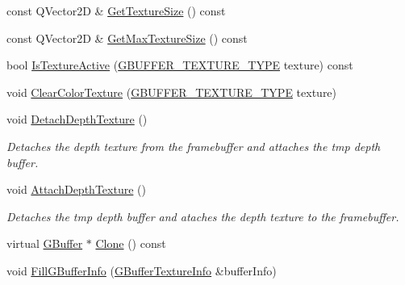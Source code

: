\begin{DoxyCompactItemize}
\item 
const Q\+Vector2D \& \mbox{\hyperlink{class_geometry_engine_1_1_geometry_buffer_1_1_g_buffer_a2b829115597fc587cd6f4ddb52b875cc}{Get\+Texture\+Size}} () const
\item 
const Q\+Vector2D \& \mbox{\hyperlink{class_geometry_engine_1_1_geometry_buffer_1_1_g_buffer_a47bda4849000d2728538de4e2f27f11a}{Get\+Max\+Texture\+Size}} () const
\item 
bool \mbox{\hyperlink{class_geometry_engine_1_1_geometry_buffer_1_1_g_buffer_a66ccde86e455532b2eac771163570f04}{Is\+Texture\+Active}} (\mbox{\hyperlink{class_geometry_engine_1_1_geometry_buffer_1_1_g_buffer_a718dceafcac1915f7de061108597e1cc}{G\+B\+U\+F\+F\+E\+R\+\_\+\+T\+E\+X\+T\+U\+R\+E\+\_\+\+T\+Y\+PE}} texture) const
\item 
void \mbox{\hyperlink{class_geometry_engine_1_1_geometry_buffer_1_1_g_buffer_abf39c85cb87eaf0475205b59333253c0}{Clear\+Color\+Texture}} (\mbox{\hyperlink{class_geometry_engine_1_1_geometry_buffer_1_1_g_buffer_a718dceafcac1915f7de061108597e1cc}{G\+B\+U\+F\+F\+E\+R\+\_\+\+T\+E\+X\+T\+U\+R\+E\+\_\+\+T\+Y\+PE}} texture)
\item 
\mbox{\label{class_geometry_engine_1_1_geometry_buffer_1_1_g_buffer_a95a83a79632226dd0cc8878af9c76f62}} 
void \mbox{\hyperlink{class_geometry_engine_1_1_geometry_buffer_1_1_g_buffer_a95a83a79632226dd0cc8878af9c76f62}{Detach\+Depth\+Texture}} ()
\begin{DoxyCompactList}\small\item\em Detaches the depth texture from the framebuffer and attaches the tmp depth buffer. \end{DoxyCompactList}\item 
\mbox{\label{class_geometry_engine_1_1_geometry_buffer_1_1_g_buffer_a3a95e0e90117676e44a29c09eb15c65d}} 
void \mbox{\hyperlink{class_geometry_engine_1_1_geometry_buffer_1_1_g_buffer_a3a95e0e90117676e44a29c09eb15c65d}{Attach\+Depth\+Texture}} ()
\begin{DoxyCompactList}\small\item\em Detaches the tmp depth buffer and ataches the depth texture to the framebuffer. \end{DoxyCompactList}\item 
virtual \mbox{\hyperlink{class_geometry_engine_1_1_geometry_buffer_1_1_g_buffer}{G\+Buffer}} $\ast$ \mbox{\hyperlink{class_geometry_engine_1_1_geometry_buffer_1_1_g_buffer_af993f8c23f7e78051f3071be4873af9d}{Clone}} () const
\item 
void \mbox{\hyperlink{class_geometry_engine_1_1_geometry_buffer_1_1_g_buffer_ad1242e69d277b69b58497f7d489e176c}{Fill\+G\+Buffer\+Info}} (\mbox{\hyperlink{class_geometry_engine_1_1_g_buffer_texture_info}{G\+Buffer\+Texture\+Info}} \&buffer\+Info)
\end{DoxyCompactItemize}
